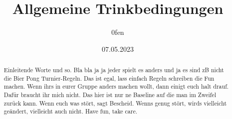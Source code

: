 \documentclass{article}
\title{Allgemeine Trinkbedingungen}
\author{0fen}
\date{07.05.2023}
\begin{document}


\maketitle
\begin{abstract}
	Einleitende Worte und so.
	Bla bla ja ja jeder spielt es anders und ja es sind zB nicht die Bier Pong Turnier-Regeln.
	Das ist egal, lass einfach Regeln schreiben die Fun machen.
	Wenn ihrs in eurer Gruppe anders machen wollt, dann einigt euch halt drauf.
	Dafür braucht ihr mich nicht.
	Das hier ist nur ne Baseline auf die man im Zweifel zurück kann.
	Wenn euch was stört, sagt Bescheid.
	Wenns genug stört, wirds vielleicht geändert, vielleicht auch nicht.
	Have fun, take care.
\end{abstract}











\end{document}
